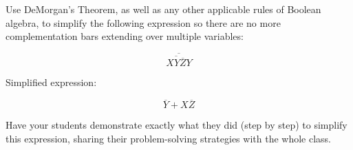 

Use DeMorgan's Theorem, as well as any other applicable rules of Boolean algebra, to simplify the following expression so there are no more complementation bars extending over multiple variables:

$$\overline{ \overline{XY \overline{Z}} Y }$$







Simplified expression:

$$\overline{Y} + X \overline{Z}$$







Have your students demonstrate exactly what they did (step by step) to simplify this expression, sharing their problem-solving strategies with the whole class.




